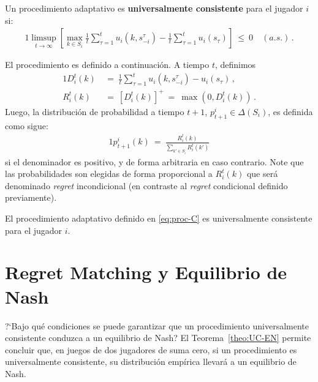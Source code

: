 \begin{definition}
\label{def:proc-univ-consistente}
Un procedimiento adaptativo es \textbf{universalmente consistente} para el jugador $i$ si:
\begin{alignat}{1}
	\limsup_{t \rightarrow \infty } \left[ \max_{k \in S_i} \frac{1}{t} \sum_{\tau = 1}^{t} u_i(k, s_{-i}^{\tau}) - \frac{1}{t} \sum_{\tau = 1}^{t} u_i(s_{\tau}) \right]\ \leq\ 0\quad (a. s.) \,.
\end{alignat}
\end{definition}
El procedimiento es definido a continuación. A tiempo $t$, definimos
\begin{alignat}{1}
D_i^t(k)\ &=\ \frac{1}{t} \sum_{\tau = 1}^{t} u_i(k, s_{-i}^{\tau}) - u_i(s_{\tau}) \,, \\
R_i^t(k)\ &=\ [D_i^t(k)]^+\ =\ \max(0, D_i^t(k)) \,.
\end{alignat}
Luego, la distribución de probabilidad a tiempo $t+1$, $p_{t+1}^i \in \Delta(S_i)$, es definida como sigue:
\begin{alignat}{1}
\label{eq:proc-C}
  p_{t+1}^i(k)\ =\ \frac{R_i^t(k)}{\sum_{k'\in S_i} R_i^t(k')}
\end{alignat}
si el denominador es positivo, y de forma arbitraria en caso contrario. Note que las probabilidades son elegidas de forma proporcional a $R_i^t(k)$ que será denominado \textit{regret} incondicional (en contraste al \textit{regret} condicional definido previamente).

\begin{theorem}
\label{theo:conv-proc-C}
El procedimiento adaptativo definido en \eqref{eq:proc-C} es universalmente consistente para el jugador $i$.
\end{theorem}

\section{Regret Matching y Equilibrio de Nash}

?`Bajo qué condiciones se puede garantizar que un procedimiento universalmente consistente conduzca a un equilibrio de Nash? El Teorema~\ref{theo:UC-EN} permite concluir que, en juegos de dos jugadores de suma cero, si un procedimiento es universalmente consistente, su distribución empírica llevará a un equilibrio de Nash.

